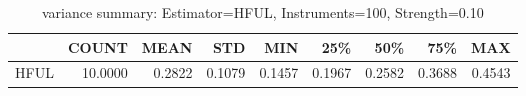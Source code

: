 \begin{table}[ht]
\centering
\caption{variance summary: Estimator=HFUL, Instruments=100, Strength=0.10}
\begin{tabular}{lrrrrrrrr}
\toprule
 & COUNT & MEAN & STD & MIN & 25\% & 50\% & 75\% & MAX \\
\midrule
HFUL & 10.0000 & 0.2822 & 0.1079 & 0.1457 & 0.1967 & 0.2582 & 0.3688 & 0.4543 \\
\bottomrule
\end{tabular}
\end{table}
